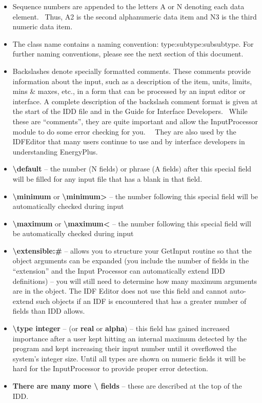 \begin{itemize}
\item
  Sequence numbers are appended to the letters A or N denoting each data element.~ Thus, A2 is the second alphanumeric data item and N3 is the third numeric data item.
\item
  The class name contains a naming convention: type:subtype:subsubtype. For further naming conventions, please see the next section of this document.
\item
  Backslashes denote specially formatted comments. These comments provide information about the input, such as a description of the item, units, limits, mins \& maxes, etc., in a form that can be processed by an input editor or interface. A complete description of the backslash comment format is given at the start of the IDD file and in the Guide for Interface Developers.~ While these are ``comments'', they are quite important and allow the InputProcessor module to do some error checking for you.~~ They are also used by the IDFEditor that many users continue to use and by interface developers in understanding EnergyPlus.
\item
  \textbf{\textbackslash{}default} -- the number (N fields) or phrase (A fields) after this special field will be filled for any input file that has a blank in that field.
\item
  \textbf{\textbackslash{}minimum} or \textbf{\textbackslash{}minimum\textgreater{}} -- the number following this special field will be automatically checked during input
\item
  \textbf{\textbackslash{}maximum} or \textbf{\textbackslash{}maximum\textless{}} -- the number following this special field will be automatically checked during input
\item
  \textbf{\textbackslash{}extensible:\#} -- allows you to structure your GetInput routine so that the object arguments can be expanded (you include the number of fields in the ``extension'' and the Input Processor can automatically extend IDD definitions) -- you will still need to determine how many maximum arguments are in the object. The IDF Editor does not use this field and cannot auto-extend such objects if an IDF is encountered that has a greater number of fields than IDD allows.
\item
  \textbf{\textbackslash{}type integer} -- (or \textbf{real} or \textbf{alpha}) -- this field has gained increased importance after a user kept hitting an internal maximum detected by the program and kept increasing their input number until it overflowed the system's integer size. Until all types are shown on numeric fields it will be hard for the InputProcessor to provide proper error detection.
\item
  \textbf{There are many more \textbackslash{} fields} -- these are described at the top of the IDD.
\end{itemize}

